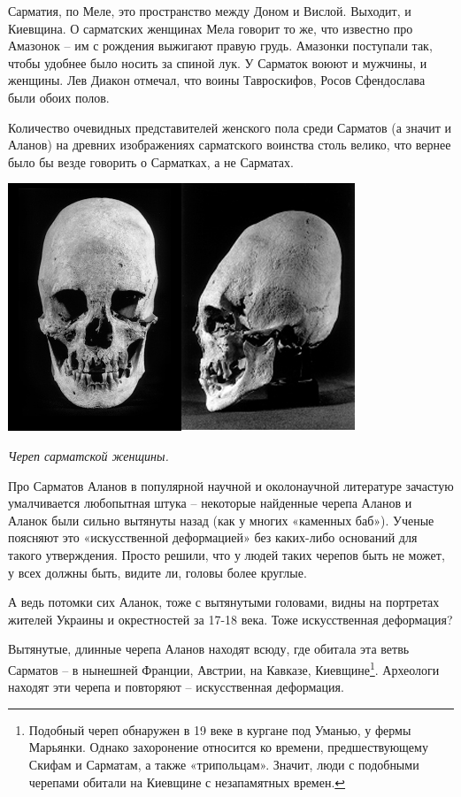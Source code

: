 Сарматия, по Меле, это пространство между Доном и Вислой. Выходит, и Киевщина. О сарматских женщинах Мела говорит то же, что известно про Амазонок – им с рождения выжигают правую грудь. Амазонки поступали так, чтобы удобнее было носить за спиной лук. У Сарматок воюют и мужчины, и женщины. Лев Диакон отмечал, что воины Тавроскифов, Росов Сфендослава были обоих полов.

Количество очевидных представителей женского пола среди Сарматов (а значит и Аланов) на древних изображениях сарматского воинства столь велико, что вернее было бы везде говорить о Сарматках, а не Сарматах.

\begin{center}
\includegraphics[width=0.70\linewidth]{chast-colebanie-osnov/alani/aw01.png}

\textit{Череп сарматской женщины.}
\end{center} 

Про Сарматов Аланов в популярной научной и околонаучной литературе зачастую умалчивается любопытная штука – некоторые найденные черепа Аланов и Аланок были сильно вытянуты назад (как у многих «каменных баб»). Ученые поясняют это «искусственной деформацией» без каких-либо оснований для такого утверждения. Просто решили, что у людей таких черепов быть не может, у всех должны быть, видите ли, головы более круглые.

А ведь потомки сих Аланок, тоже с вытянутыми головами, видны на портретах жителей Украины и окрестностей за 17-18 века. Тоже искусственная деформация?

Вытянутые, длинные черепа Аланов находят всюду, где обитала эта ветвь Сарматов – в нынешней Франции, Австрии, на Кавказе, Киевщине\footnote{Подобный череп обнаружен в 19 веке в кургане под Уманью, у фермы Марьянки. Однако захоронение относится ко времени, предшествующему Скифам и Сарматам, а также «трипольцам». Значит, люди с подобными черепами обитали на Киевщине с незапамятных времен.}. Археологи находят эти черепа и повторяют – искусственная деформация. 

